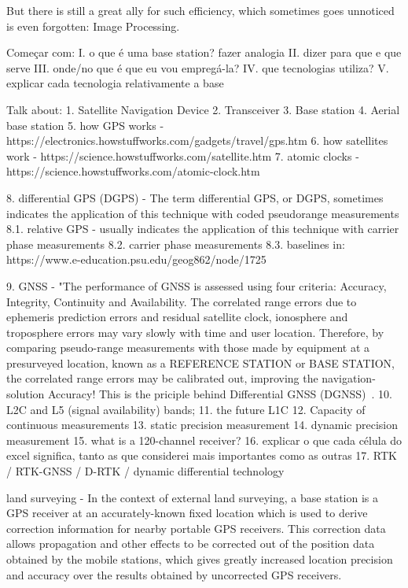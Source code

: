 But there is still a great ally for such efficiency, which sometimes goes unnoticed is even forgotten: Image Processing.

Começar com:
I. o que é uma base station? fazer analogia
II. dizer para que e que serve
III. onde/no que é que eu vou empregá-la?
IV. que tecnologias utiliza?
V. explicar cada tecnologia relativamente a base

Talk about:
    1. Satellite Navigation Device
    2. Transceiver
    3. Base station
    4. Aerial base station
    5. how GPS works - https://electronics.howstuffworks.com/gadgets/travel/gps.htm
    6. how satellites work - https://science.howstuffworks.com/satellite.htm
    7. atomic clocks - https://science.howstuffworks.com/atomic-clock.htm

    8. differential GPS (DGPS) - The term differential GPS, or DGPS, sometimes indicates the application of this technique with coded pseudorange measurements
    8.1. relative GPS - usually indicates the application of this technique with carrier phase measurements
    8.2. carrier phase measurements
    8.3. baselines
    in: https://www.e-education.psu.edu/geog862/node/1725

    9. GNSS - "The performance of GNSS is assessed using four criteria: Accuracy, Integrity, Continuity and Availability. The correlated range errors due to ephemeris prediction errors and residual satellite clock, ionosphere and troposphere errors may vary slowly with time and user location.
    Therefore, by comparing pseudo-range measurements with those made by equipment at a presurveyed location, known as a REFERENCE STATION or BASE STATION, the correlated range errors may be calibrated out, improving the navigation-solution Accuracy! This is the priciple behind Differential GNSS (DGNSS)~\cite{edseee_9101092}. %
    10. L2C and L5 (signal availability) bands;
    11. the future L1C
    12. Capacity of continuous measurements
    13. static precision measurement
    14. dynamic precision measurement
    15. what is a 120-channel receiver?
    16. explicar o que cada célula do excel significa, tanto as que considerei mais importantes como as outras
    17. RTK / RTK-GNSS / D-RTK / dynamic differential technology~\cite{ayers_geosystems_2011}
       
    land surveying - In the context of external land surveying, a base station is a GPS receiver at an accurately-known fixed location which is used to derive correction information for nearby portable GPS receivers. This correction data allows propagation and other effects to be corrected out of the position data obtained by the mobile stations, which gives greatly increased location precision and accuracy over the results obtained by uncorrected GPS receivers.

